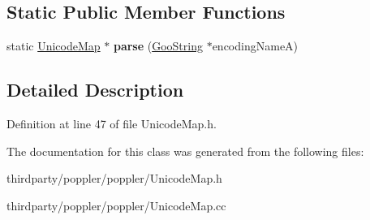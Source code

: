 \subsection*{Static Public Member Functions}
\begin{DoxyCompactItemize}
\item 
\mbox{\label{class_unicode_map_a6e084d8bccef69a9909774bd60f79571}} 
static \hyperlink{class_unicode_map}{Unicode\+Map} $\ast$ {\bfseries parse} (\hyperlink{class_goo_string}{Goo\+String} $\ast$encoding\+NameA)
\end{DoxyCompactItemize}


\subsection{Detailed Description}


Definition at line 47 of file Unicode\+Map.\+h.



The documentation for this class was generated from the following files\+:\begin{DoxyCompactItemize}
\item 
thirdparty/poppler/poppler/Unicode\+Map.\+h\item 
thirdparty/poppler/poppler/Unicode\+Map.\+cc\end{DoxyCompactItemize}
